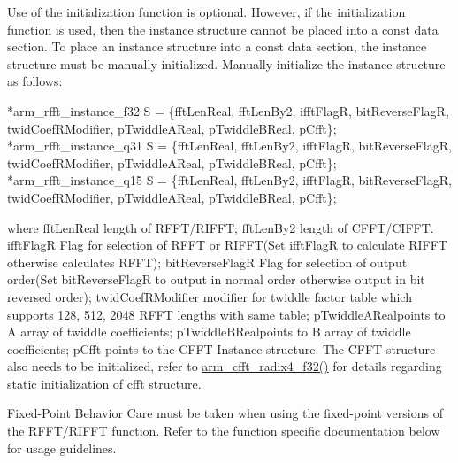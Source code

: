 \begin{DoxyParagraph}{}
Use of the initialization function is optional. However, if the initialization function is used, then the instance structure cannot be placed into a const data section. To place an instance structure into a const data section, the instance structure must be manually initialized. Manually initialize the instance structure as follows\-: 
\begin{DoxyPre}    
*arm\_rfft\_instance\_f32 S = \{fftLenReal, fftLenBy2, ifftFlagR, bitReverseFlagR, twidCoefRModifier, pTwiddleAReal, pTwiddleBReal, pCfft\};    
*arm\_rfft\_instance\_q31 S = \{fftLenReal, fftLenBy2, ifftFlagR, bitReverseFlagR, twidCoefRModifier, pTwiddleAReal, pTwiddleBReal, pCfft\};    
*arm\_rfft\_instance\_q15 S = \{fftLenReal, fftLenBy2, ifftFlagR, bitReverseFlagR, twidCoefRModifier, pTwiddleAReal, pTwiddleBReal, pCfft\};    
  \end{DoxyPre}
 where {\ttfamily fft\-Len\-Real} length of R\-F\-F\-T/\-R\-I\-F\-F\-T; {\ttfamily fft\-Len\-By2} length of C\-F\-F\-T/\-C\-I\-F\-F\-T. {\ttfamily ifft\-Flag\-R} Flag for selection of R\-F\-F\-T or R\-I\-F\-F\-T(\-Set ifft\-Flag\-R to calculate R\-I\-F\-F\-T otherwise calculates R\-F\-F\-T); {\ttfamily bit\-Reverse\-Flag\-R} Flag for selection of output order(\-Set bit\-Reverse\-Flag\-R to output in normal order otherwise output in bit reversed order); {\ttfamily twid\-Coef\-R\-Modifier} modifier for twiddle factor table which supports 128, 512, 2048 R\-F\-F\-T lengths with same table; {\ttfamily p\-Twiddle\-A\-Real}points to A array of twiddle coefficients; {\ttfamily p\-Twiddle\-B\-Real}points to B array of twiddle coefficients; {\ttfamily p\-Cfft} points to the C\-F\-F\-T Instance structure. The C\-F\-F\-T structure also needs to be initialized, refer to \hyperlink{group___radix4___c_f_f_t___c_i_f_f_t_ga521f670cd9c571bc61aff9bec89f4c26}{arm\-\_\-cfft\-\_\-radix4\-\_\-f32()} for details regarding static initialization of cfft structure.
\end{DoxyParagraph}
\begin{DoxyParagraph}{Fixed-\/\-Point Behavior }
Care must be taken when using the fixed-\/point versions of the R\-F\-F\-T/\-R\-I\-F\-F\-T function. Refer to the function specific documentation below for usage guidelines. 
\end{DoxyParagraph}



